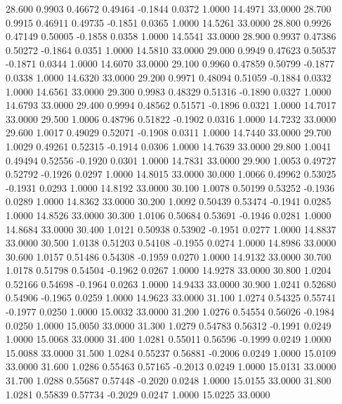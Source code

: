   28.600   0.9903   0.46672   0.49464  -0.1844   0.0372   1.0000  14.4971  33.0000
  28.700   0.9915   0.46911   0.49735  -0.1851   0.0365   1.0000  14.5261  33.0000
  28.800   0.9926   0.47149   0.50005  -0.1858   0.0358   1.0000  14.5541  33.0000
  28.900   0.9937   0.47386   0.50272  -0.1864   0.0351   1.0000  14.5810  33.0000
  29.000   0.9949   0.47623   0.50537  -0.1871   0.0344   1.0000  14.6070  33.0000
  29.100   0.9960   0.47859   0.50799  -0.1877   0.0338   1.0000  14.6320  33.0000
  29.200   0.9971   0.48094   0.51059  -0.1884   0.0332   1.0000  14.6561  33.0000
  29.300   0.9983   0.48329   0.51316  -0.1890   0.0327   1.0000  14.6793  33.0000
  29.400   0.9994   0.48562   0.51571  -0.1896   0.0321   1.0000  14.7017  33.0000
  29.500   1.0006   0.48796   0.51822  -0.1902   0.0316   1.0000  14.7232  33.0000
  29.600   1.0017   0.49029   0.52071  -0.1908   0.0311   1.0000  14.7440  33.0000
  29.700   1.0029   0.49261   0.52315  -0.1914   0.0306   1.0000  14.7639  33.0000
  29.800   1.0041   0.49494   0.52556  -0.1920   0.0301   1.0000  14.7831  33.0000
  29.900   1.0053   0.49727   0.52792  -0.1926   0.0297   1.0000  14.8015  33.0000
  30.000   1.0066   0.49962   0.53025  -0.1931   0.0293   1.0000  14.8192  33.0000
  30.100   1.0078   0.50199   0.53252  -0.1936   0.0289   1.0000  14.8362  33.0000
  30.200   1.0092   0.50439   0.53474  -0.1941   0.0285   1.0000  14.8526  33.0000
  30.300   1.0106   0.50684   0.53691  -0.1946   0.0281   1.0000  14.8684  33.0000
  30.400   1.0121   0.50938   0.53902  -0.1951   0.0277   1.0000  14.8837  33.0000
  30.500   1.0138   0.51203   0.54108  -0.1955   0.0274   1.0000  14.8986  33.0000
  30.600   1.0157   0.51486   0.54308  -0.1959   0.0270   1.0000  14.9132  33.0000
  30.700   1.0178   0.51798   0.54504  -0.1962   0.0267   1.0000  14.9278  33.0000
  30.800   1.0204   0.52166   0.54698  -0.1964   0.0263   1.0000  14.9433  33.0000
  30.900   1.0241   0.52680   0.54906  -0.1965   0.0259   1.0000  14.9623  33.0000
  31.100   1.0274   0.54325   0.55741  -0.1977   0.0250   1.0000  15.0032  33.0000
  31.200   1.0276   0.54554   0.56026  -0.1984   0.0250   1.0000  15.0050  33.0000
  31.300   1.0279   0.54783   0.56312  -0.1991   0.0249   1.0000  15.0068  33.0000
  31.400   1.0281   0.55011   0.56596  -0.1999   0.0249   1.0000  15.0088  33.0000
  31.500   1.0284   0.55237   0.56881  -0.2006   0.0249   1.0000  15.0109  33.0000
  31.600   1.0286   0.55463   0.57165  -0.2013   0.0249   1.0000  15.0131  33.0000
  31.700   1.0288   0.55687   0.57448  -0.2020   0.0248   1.0000  15.0155  33.0000
  31.800   1.0281   0.55839   0.57734  -0.2029   0.0247   1.0000  15.0225  33.0000
